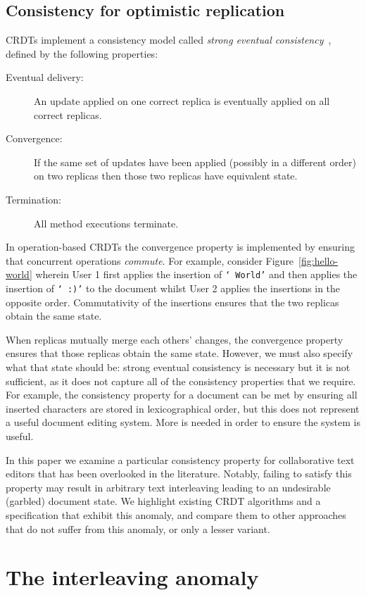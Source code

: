 \documentclass[sigconf]{acmart}
\begin{document}
\subsection{Consistency for optimistic replication}

CRDTs implement a consistency model called \emph{strong eventual consistency}~\cite{Shapiro:2011un,Gomes:2017gy}, defined by the following properties:
\begin{description}
\item[Eventual delivery:] An update applied on one correct replica is eventually applied on all correct replicas.
\item[Convergence:] If the same set of updates have been applied (possibly in a different order) on two replicas then those two replicas have equivalent state.
\item[Termination:] All method executions terminate.
\end{description}
In operation-based CRDTs the convergence property is implemented by ensuring that concurrent operations \emph{commute}.
For example, consider Figure~\ref{fig:hello-world} wherein User 1 first applies the insertion of \texttt{` World'} and then applies the insertion of \texttt{` :)'} to the document whilst User 2 applies the insertions in the opposite order.
Commutativity of the insertions ensures that the two replicas obtain the same state.

When replicas mutually merge each others' changes, the convergence property ensures that those replicas obtain the same state.
However, we must also specify what that state should be: strong eventual consistency is necessary but it is not sufficient, as it does not capture all of the consistency properties that we require.
For example, the consistency property for a document can be met by ensuring all inserted characters are stored in lexicographical order, but this does not represent a useful document editing system. More is needed in order to ensure the system is useful.

In this paper we examine a particular consistency property for collaborative text editors that has been overlooked in the literature.
Notably, failing to satisfy this property may result in arbitrary text interleaving leading to an undesirable (garbled) document state.
We highlight existing CRDT algorithms and a specification that exhibit this anomaly, and compare them to other approaches that do not suffer from this anomaly, or only a lesser variant.

\section{The interleaving anomaly}\label{sec:anomaly}
\end{document}
